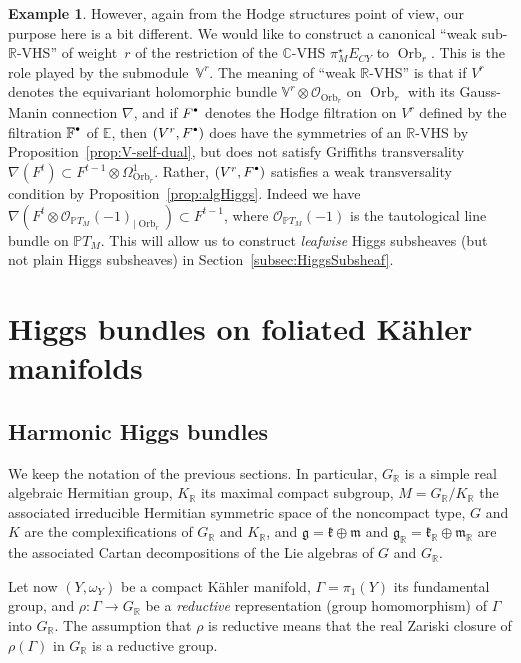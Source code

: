 \documentclass[10pt]{amsart}
\let\mathcal\mathscr
\newcommand{\sbullet}{{\scriptscriptstyle\bullet}}
\newcommand{\scbullet}{{\raisebox{1pt}{$\sbullet$}}}
\theoremstyle{plain}
\theoremstyle{definition}
\newtheorem{exem}[theo]{Example}
\let\rgy r
\DeclareMathOperator{\Orb}{Orb}
\newcommand{\cO}{\mathcal{O}}
\newcommand{\bC}{\mathbb{C}}
\newcommand{\bE}{\mathbb{E}}
\newcommand{\bF}{\mathbb{F}}
\newcommand{\bR}{\mathbb{R}}
\newcommand{\bPTM}{{\mathbb{P}T_M}}
\newcommand{\Vr}{\mathbb{V}^\rgy}
\newcommand{\fgg}{\mathfrak{g}}
\newcommand{\fk}{\mathfrak{k}}
\newcommand{\fm}{\mathfrak{m}}
\begin{document}
\begin{exem}
However, again from the Hodge structures point of view, our purpose here is a bit
different. We would like to construct a canonical ``weak sub-$\bR$-VHS'' of weight~$\rgy$ of the
restriction of
the $\bC$-VHS $\pi_M^\star E_{CY}$ to ${\Orb}_\rgy$. This is the role played by the submodule~$\Vr$. The meaning of ``weak $\bR$-VHS'' is that if $V^\rgy$ denotes the equivariant holomorphic
bundle $\Vr\otimes\cO_{\Orb_\rgy}$ on $\Orb_\rgy$ with its Gauss-Manin connection $\nabla$, and if
$F^\scbullet$ denotes the Hodge filtration on $V^r$ defined by the filtration $\bF^\scbullet$ of $\bE$, then
$(V^r,F^\scbullet)$ does have the symmetries of an $\bR$-VHS by Proposition~\ref{prop:V-self-dual},
but does not satisfy
Griffiths transversality $\nabla(F^t)\subset F^{t-1}\otimes\Omega^1_{\Orb_\rgy}$. Rather,
$(V^\rgy,F^\scbullet)$ satisfies a weak transversality condition by
Proposition~\ref{prop:algHiggs}. Indeed we have
$\nabla(F^t\otimes\cO_\bPTM(-1)_{|\Orb_\rgy})\subset F^{t-1}$, where $\cO_\bPTM(-1)$ is the
tautological line bundle on $\bPTM$. This will allow us to construct \emph{leafwise}
Higgs subsheaves (but not plain Higgs subsheaves) in Section~\ref{subsec:HiggsSubsheaf}.
\end{exem}

\section{Higgs bundles on foliated Kähler manifolds}
\label{sec:HiggsFoliated}

\subsection{Harmonic Higgs bundles}
\label{subsec:Higgs}

We keep the notation of the previous sections. In particular, $G_\bR$ is a simple real algebraic
Hermitian group, $K_\bR$ its maximal compact subgroup, $M=G_\bR/K_\bR$ the associated irreducible
Hermitian symmetric space of the noncompact type, $G$ and $K$ are the complexifications of $G_\bR$
and $K_\bR$, and $\fgg=\fk\oplus\fm$ and $\fgg_\bR=\fk_\bR\oplus\fm_\bR$ are the
associated Cartan decompositions of the Lie algebras of $G$ and $G_\bR$.

Let now $(Y,\omega_Y)$ be a compact Kähler manifold, $\Gamma=\pi_1(Y)$ its fundamental group, and $\rho:\Gamma\to
G_\bR$ be a
\emph{reductive} representation (group homomorphism) of $\Gamma$ into $G_\bR$. The assumption that $\rho$
is reductive
means that the real Zariski closure of $\rho(\Gamma)$ in $G_\bR$ is a reductive group.
\end{document}
